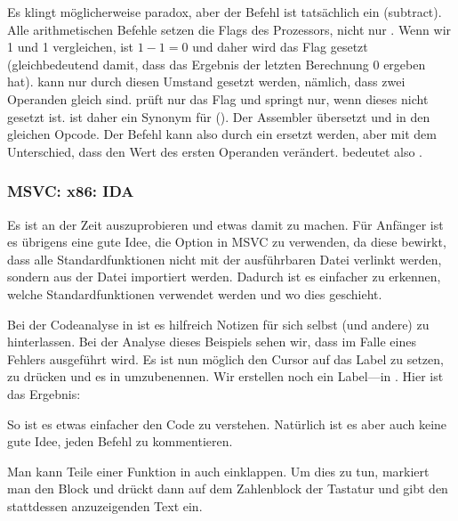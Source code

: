 \label{CMPandSUB}
Es klingt möglicherweise paradox, aber der \CMP Befehl ist tatsächlich ein \SUB (subtract).
Alle arithmetischen Befehle setzen die Flags des Prozessors, nicht nur \CMP.
Wenn wir 1 und 1 vergleichen, ist $1-1=0$ und daher wird das \ZF Flag gesetzt (gleichbedeutend damit, dass das Ergebnis
der letzten Berechnung 0 ergeben hat).
\ZF kann nur durch diesen Umstand gesetzt werden, nämlich, dass zwei Operanden gleich sind.
\JNE prüft nur das \ZF Flag und springt nur, wenn dieses nicht gesetzt ist. \JNE ist daher ein Synonym für \JNZ
().
Der Assembler übersetzt \JNE und \JNZ in den gleichen Opcode.
Der \CMP Befehl kann also durch ein \SUB ersetzt werden, aber mit dem Unterschied, dass \SUB den Wert des ersten
Operanden verändert. \CMP bedeutet also .

\subsubsection{MSVC: x86: IDA}

Es ist an der Zeit \IDA auszuprobieren und etwas damit zu machen.
Für Anfänger ist es übrigens eine gute Idee, die  Option in MSVC zu verwenden, da diese bewirkt, dass alle
Standardfunktionen nicht mit der ausführbaren Datei verlinkt werden, sondern aus der Datei  importiert
werden. Dadurch ist es einfacher zu erkennen, welche Standardfunktionen verwendet werden und wo dies geschieht.

Bei der Codeanalyse in \IDA ist es hilfreich Notizen für sich selbst (und andere) zu hinterlassen.
Bei der Analyse dieses Beispiels sehen wir, dass  im Falle eines Fehlers ausgeführt wird.
Es ist nun möglich den Cursor auf das Label zu setzen,  zu drücken und es in  umzubenennen.
Wir erstellen noch ein Label---in .
Hier ist das Ergebnis:


So ist es etwas einfacher den Code zu verstehen. Natürlich ist es aber auch keine gute Idee, jeden Befehl zu
kommentieren.

Man kann Teile einer Funktion in \IDA auch einklappen. Um dies zu tun, markiert man den Block und drückt dann \q{--} auf
dem Zahlenblock der Tastatur und gibt den stattdessen anzuzeigenden Text ein.

